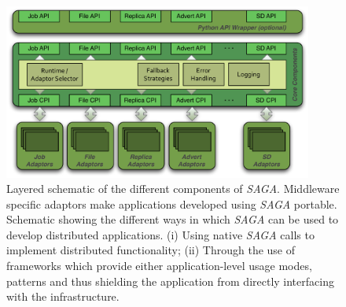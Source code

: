 \documentclass[a4paper,10pt]{article}
\newcommand{\sagaimpl}{\textit{SAGA}\xspace}
\newcommand{\impl}{\sagaimpl}
\begin{document}
\pagebreak

\begin{figure}[hb]
  \centering
  \includegraphics[width=4in]{./figures/saga-architecture}
 \vspace{-1em}	
  \caption{\footnotesize Layered schematic of the different
    components of \impl.  Middleware specific adaptors make
    applications developed using \impl portable.  Schematic showing
    the different ways in which \impl can be used to develop
    distributed applications. (i) Using native \impl calls to
    implement distributed functionality; (ii) Through the use of
    frameworks which provide either application-level usage modes,
    patterns and thus shielding the application from directly
    interfacing with the infrastructure.}
  \label{fig:saga_arch}
\end{figure}

  
 
\end{document}
